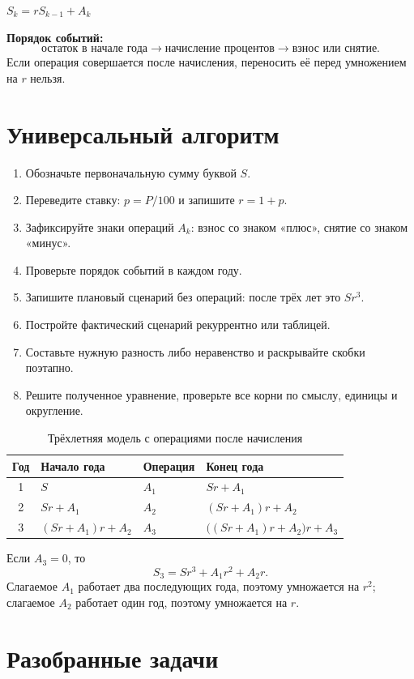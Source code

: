 \documentclass[a4paper,12pt]{article}
\newcommand{\term}[1]{\textcolor{darkaccent}{\textbf{#1}}}
\newcommand{\formula}[1]{%
  \begin{center}
    \begin{minipage}{0.94\linewidth}
      \centering\large\color{darkaccent}#1
    \end{minipage}
  \end{center}}
\begin{document}
\formula{$\boxed{S_k=rS_{k-1}+A_k}$}

\term{Порядок событий:}
\[
\text{остаток в начале года}
\longrightarrow
\text{начисление процентов}
\longrightarrow
\text{взнос или снятие}.
\]
Если операция совершается после начисления, переносить её перед умножением на
$r$ нельзя.

\section{Универсальный алгоритм}

\begin{enumerate}
  \item Обозначьте первоначальную сумму буквой $S$.
  \item Переведите ставку: $p=P/100$ и запишите $r=1+p$.
  \item Зафиксируйте знаки операций $A_k$: взнос со знаком «плюс», снятие со знаком «минус».
  \item Проверьте порядок событий в каждом году.
  \item Запишите плановый сценарий без операций: после трёх лет это $Sr^3$.
  \item Постройте фактический сценарий рекуррентно или таблицей.
  \item Составьте нужную разность либо неравенство и раскрывайте скобки поэтапно.
  \item Решите полученное уравнение, проверьте все корни по смыслу, единицы и округление.
\end{enumerate}

\begin{table}[ht]
\centering
\caption{Трёхлетняя модель с операциями после начисления}
\begin{tabularx}{\linewidth}{@{}cXXX@{}}
\toprule
Год & Начало года & Операция & Конец года \\
\midrule
1 & $S$ & $A_1$ & $Sr+A_1$ \\
2 & $Sr+A_1$ & $A_2$ & $(Sr+A_1)r+A_2$ \\
3 & $(Sr+A_1)r+A_2$ & $A_3$ & $\bigl((Sr+A_1)r+A_2\bigr)r+A_3$ \\
\bottomrule
\end{tabularx}
\end{table}

Если $A_3=0$, то
\[
S_3=Sr^3+A_1r^2+A_2r.
\]
Слагаемое $A_1$ работает два последующих года, поэтому умножается на $r^2$;
слагаемое $A_2$ работает один год, поэтому умножается на $r$.

\section{Разобранные задачи}
\end{document}
